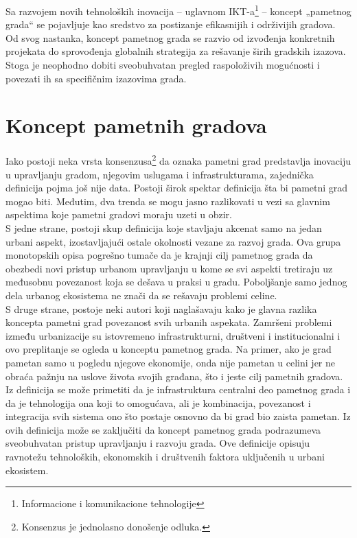 \documentclass[a4paper,12pt]{article}
\begin{document}
{Sa razvojem novih tehnoloških inovacija – uglavnom IKT-a\footnote{Informacione i komunikacione tehnologije} – koncept „pametnog grada“ se pojavljuje kao sredstvo za postizanje efikasnijih i održivijih gradova. \\

Od svog nastanka, koncept pametnog grada se razvio od izvođenja konkretnih projekata do sprovođenja globalnih strategija za rešavanje širih gradskih izazova. Stoga je neophodno dobiti sveobuhvatan pregled raspoloživih mogućnosti i povezati ih sa specifičnim izazovima grada.


\section{Koncept pametnih gradova}


Iako postoji neka vrsta konsenzusa\footnote{Konsenzus je jednolasno donošenje odluka.} da oznaka pametni grad predstavlja inovaciju u upravljanju gradom, njegovim uslugama i infrastrukturama, zajednička definicija pojma još nije data. Postoji širok spektar definicija šta bi pametni grad mogao biti. Međutim, dva trenda se mogu jasno razlikovati u vezi sa glavnim aspektima koje pametni gradovi moraju uzeti u obzir. \\

S jedne strane, postoji skup definicija koje stavljaju akcenat samo na jedan urbani aspekt, izostavljajući ostale okolnosti vezane za razvoj grada. Ova grupa monotopskih opisa pogrešno tumače da je krajnji cilj pametnog grada da obezbedi novi pristup urbanom upravljanju u kome se svi aspekti tretiraju uz međusobnu povezanost koja se dešava u praksi u gradu. Poboljšanje samo jednog dela urbanog ekosistema ne znači da se rešavaju problemi celine. \\

S druge strane, postoje neki autori koji naglašavaju kako je glavna razlika koncepta pametni grad povezanost svih urbanih aspekata. Zamršeni problemi između urbanizacije su istovremeno infrastrukturni, društveni i institucionalni i ovo preplitanje se ogleda u konceptu pametnog grada. Na primer, ako je grad pametan samo u pogledu njegove ekonomije, onda nije pametan u celini jer ne obraća pažnju na uslove života svojih građana, što i jeste cilj pametnih gradova. Iz definicija se može primetiti da je infrastruktura centralni deo pametnog grada i da je tehnologija ona koji to omogućava, ali je kombinacija, povezanost i integracija svih sistema ono što postaje osnovno da bi grad bio zaista pametan. Iz ovih definicija može se zaključiti da koncept pametnog grada podrazumeva sveobuhvatan pristup upravljanju i razvoju grada. Ove definicije opisuju ravnotežu tehnoloških, ekonomskih i društvenih faktora uključenih u urbani ekosistem.\cite{referenca2}\\



}
\end{document}
